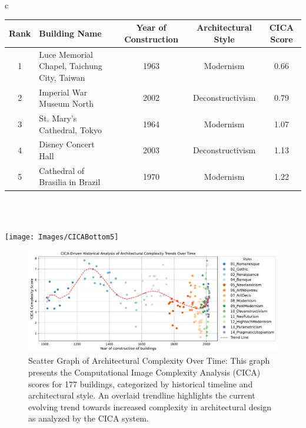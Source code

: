 \documentclass[final,5p,times]{elsarticle}
\begin{document}
\begin{table}[!htb]
\begin{tabular}{c}
\begin{minipage}{\textwidth}
\begin{tabularx}{\linewidth}{c X c c c}
        \hline
        \textbf{Rank} & \textbf{Building Name} & \textbf{Year of Construction} & \textbf{Architectural Style} & \textbf{CICA Score} \\
        \hline
        1 & Luce Memorial Chapel, Taichung City, Taiwan & 1963 & Modernism & 0.66 \\
        2 & Imperial War Museum North & 2002 & Deconstructivism & 0.79 \\
        3 & St. Mary's Cathedral, Tokyo & 1964 & Modernism & 1.07 \\
        4 & Disney Concert Hall & 2003 & Deconstructivism & 1.13 \\
        5 & Cathedral of Brasilia in Brazil & 1970 & Modernism & 1.22 \\
        \bottomrule
        \end{tabularx}
    \end{minipage}
    \\
    \\
    \begin{minipage}{\textwidth}
        \centering
        \texttt{[image: Images/CICABottom5]}
        \label{fig:CICABottom5scores}
    \end{minipage}
\end{tabular}
\end{table}

\begin{figure}[htb]
      \centering
      \includegraphics[width= \linewidth]{Graphs/complexitygraph}
      \caption{Scatter Graph of Architectural Complexity Over Time: This graph presents the Computational Image Complexity Analysis (CICA) scores for 177 buildings, categorized by historical timeline and architectural style. An overlaid trendline highlights the current evolving trend towards increased complexity in architectural design as analyzed by the CICA system.}
      \label{fig:HistoricalComplexityGraph}
\end{figure}
\end{document}
